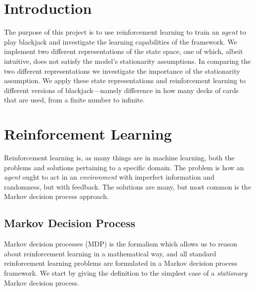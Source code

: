 



\section{Introduction}

The purpose of this project is to use reinforcement learning to train an \textit{agent} to play blackjack and investigate the learning capabilities of the framework. 
We implement two different representations of the state space, one of which, albeit intuitive, does not satisfy the model's stationarity assumptions. In comparing the two different representations we investigate the importance of the stationarity assumption. We apply these state representations and reinforcement learning to different versions of blackjack---namely difference in how many decks of cards that are used, from a finite number to infinite.


\section*{Reinforcement Learning}
Reinforcement learning is, as many things are in machine learning, both the problems and solutions pertaining to a specific domain. The problem is how an \textit{agent} ought to act in an \textit{environment} with imperfect information and randomness, but with feedback. The solutions are many, but most common is the Markov decision process approach.
 
\subsection*{Markov Decision Process}
Markov decision processes (MDP) is the formalism  which allows us to reason about reinforcement learning in a mathematical way, and all standard reinforcement learning problems are formulated in a Markov decision process framework. We start by giving the definition to the simplest case of a \textit{stationary} Markov decision process.

